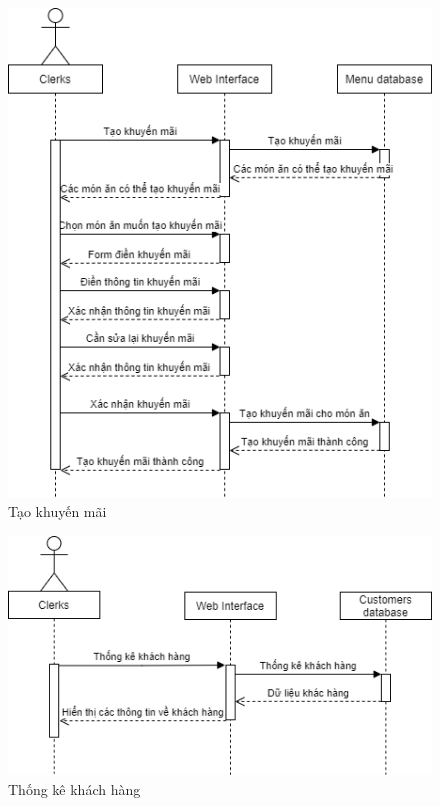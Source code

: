 \newpage
\begin{figure}[!h]
    \begin{center}
        \includegraphics[scale=0.6]{Images/SequenceDiagram/SD_promotion.png}
    \end{center}
    \hspace{0.3cm}
    \caption{Tạo khuyến mãi}
\end{figure}
\begin{figure}[!h]
    \begin{center}
        \includegraphics[scale=0.5]{Images/SequenceDiagram/SD_customers.png}
    \end{center}
    \hspace{0.3cm}
    \caption{Thống kê khách hàng}
\end{figure}

